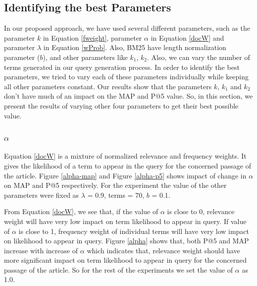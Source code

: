 \documentclass[article]{IEEEtran}
\begin{document}
\subsection{Identifying the best Parameters}
\label{best-param}
In our proposed approach, we have used several different parameters, such as the parameter $k$ in Equation \ref{fweight}, parameter $\alpha$ in Equation \ref{docW} and parameter $\lambda$ in Equation \ref{wProb}. Also, BM25 have length normalization parameter ($b$), and other parameters like $k_1$, $k_2$. Also, we can vary the number of terms generated in our query generation process. In order to identify the best parameters, we tried to vary each of these parameters individually while keeping all other parameters constant. Our results show that the parameters $k$, $k_1$ and $k_2$ don't have much of an impact on the MAP and P@5 value. So, in this section, we present the results of varying other four parameters to get their best possible value.

\subsubsection{$\alpha$}
Equation \ref{docW} is a mixture of normalized relevance and frequency weights. It gives the likelihood of a term to appear in the query for the concerned passage of the article. Figure \ref{alpha-map} and Figure \ref{alpha-p5} shows impact of change in $\alpha$ on MAP and P@5 respectively. For the experiment the value of the other parameters were fixed as $\lambda$ = 0.9, terms = 70, $b$ = 0.1.

From Equation \ref{docW}, we see that, if the value of $\alpha$ is close to 0, relevance weight will have very low impact on term likelihood to appear in query. If value of $\alpha$ is close to 1, frequency weight of individual terms will have very low impact on likelihood to appear in query.  Figure \ref{alpha} shows that, both P@5 and MAP increase with increase of $\alpha$ which indicates that, relevance weight should have more significant impact on term likelihood to appear in query for the concerned passage of the article. So for the rest of the experiments we set the value of $\alpha$ as 1.0.
\end{document}
